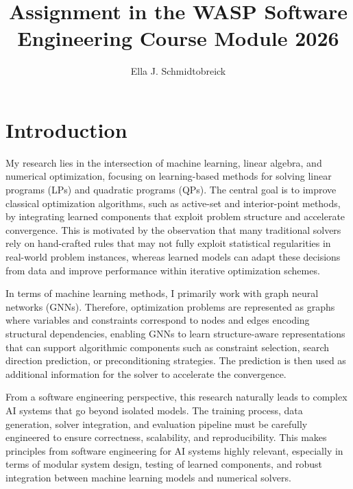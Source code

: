 \documentclass[11pt]{article}
\title{Assignment in the WASP Software Engineering Course
Module 2026}
\author{Ella J. Schmidtobreick}
\date{}
\begin{document}
\maketitle
\section{Introduction}

My research lies in the intersection of machine learning, linear algebra, and numerical optimization, focusing on learning-based methods for solving linear programs (LPs) and quadratic programs (QPs). The central goal is to improve classical optimization algorithms, such as active-set and interior-point methods, by integrating learned components that exploit problem structure and accelerate convergence. This is motivated by the observation that many traditional solvers rely on hand-crafted rules that may not fully exploit statistical regularities in real-world problem instances, whereas learned models can adapt these decisions from data and improve performance within iterative optimization schemes.

In terms of machine learning methods, I primarily work with graph neural networks (GNNs). Therefore, optimization problems are represented as graphs where variables and constraints correspond to nodes and edges encoding structural dependencies, enabling GNNs to learn structure-aware representations that can support algorithmic components such as constraint selection, search direction prediction, or preconditioning strategies. The prediction is then used as additional information for the solver to accelerate the convergence.

From a software engineering perspective, this research naturally leads to complex AI systems that go beyond isolated models. The training process, data generation, solver integration, and evaluation pipeline must be carefully engineered to ensure correctness, scalability, and reproducibility. This makes principles from software engineering for AI systems highly relevant, especially in terms of modular system design, testing of learned components, and robust integration between machine learning models and numerical solvers.
\end{document}
